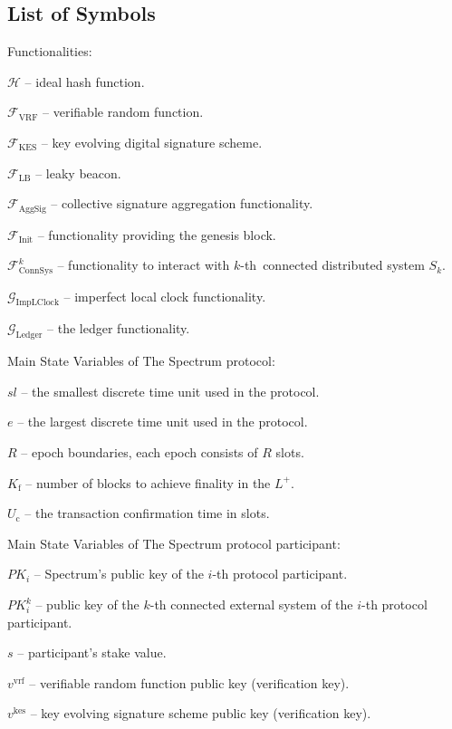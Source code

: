 \subsection{List of Symbols}\label{subsec:list-of-symbols}

Functionalities:
\begin{legal}
    \item[] $\mathcal{H}$ -- ideal hash function.
    \item[] $\mathcal{F}_{\text{VRF}}$ -- verifiable random function.
    \item[] $\mathcal{F}_{\text{KES}}$ -- key evolving digital signature scheme.
    \item[] $\mathcal{F}_{\text{LB}}$ -- leaky beacon.
    \item[] $\mathcal{F}_{\text{AggSig}}$ -- collective signature aggregation functionality.
    \item[] $\mathcal{F}_{\text{Init}}$ -- functionality providing the genesis block.
    \item[] $\mathcal{F}^k_{\text{ConnSys}}$ -- functionality to interact with $k$-th\
    connected distributed system $S_k$.
    \item[] $\mathcal{G}_{\text{ImpLClock}}$ -- imperfect local clock functionality.
    \item[] $\mathcal{G}_{\text{Ledger}}$ -- the ledger functionality.
\end{legal}
\bigbreak

\noindent
Main State Variables of The Spectrum protocol:
\begin{legal}
    \item[] $sl$ -- the smallest discrete time unit used in the protocol.
    \item[] $e$ -- the largest discrete time unit used in the protocol.
    \item[] $R$ -- epoch boundaries, each epoch consists of $R$ slots.
    \item[] $K_{\text{f}}$ -- number of blocks to achieve finality in the $L^+$.
    \item[] $U_{\text{c}}$ -- the transaction confirmation time in slots.
\end{legal}
\bigbreak

\noindent
Main State Variables of The Spectrum protocol participant:
\begin{legal}
    \item[] $PK_i$ -- Spectrum's public key of the $i$-th protocol participant.
    \item[] $PK^k_i$ -- public key of the $k$-th connected external system of the $i$-th protocol participant.
    \item[] $s$ -- participant's stake value.
    \item[] $v^{\text{vrf}}$ -- verifiable random function public key (verification key).
    \item[] $v^{\text{kes}}$ -- key evolving signature scheme public key (verification key).
\end{legal}
\bigbreak


